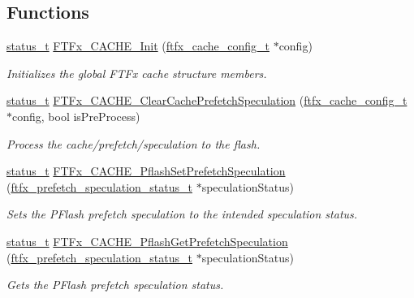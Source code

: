 \subsection*{Functions}
\begin{DoxyCompactItemize}
\item 
\mbox{\hyperlink{group__ksdk__common_gaaabdaf7ee58ca7269bd4bf24efcde092}{status\+\_\+t}} \mbox{\hyperlink{group__ftfx__cache__driver_ga4615ae98db65653ab1a578eb588d1be4}{F\+T\+Fx\+\_\+\+C\+A\+C\+H\+E\+\_\+\+Init}} (\mbox{\hyperlink{group__ftfx__cache__driver_ga8ddae8f98cec13ff7c33bc515d01c487}{ftfx\+\_\+cache\+\_\+config\+\_\+t}} $\ast$config)
\begin{DoxyCompactList}\small\item\em Initializes the global F\+T\+Fx cache structure members. \end{DoxyCompactList}\item 
\mbox{\hyperlink{group__ksdk__common_gaaabdaf7ee58ca7269bd4bf24efcde092}{status\+\_\+t}} \mbox{\hyperlink{group__ftfx__cache__driver_ga9de53487ab56d930f26f14f4410b6f20}{F\+T\+Fx\+\_\+\+C\+A\+C\+H\+E\+\_\+\+Clear\+Cache\+Prefetch\+Speculation}} (\mbox{\hyperlink{group__ftfx__cache__driver_ga8ddae8f98cec13ff7c33bc515d01c487}{ftfx\+\_\+cache\+\_\+config\+\_\+t}} $\ast$config, bool is\+Pre\+Process)
\begin{DoxyCompactList}\small\item\em Process the cache/prefetch/speculation to the flash. \end{DoxyCompactList}\item 
\mbox{\hyperlink{group__ksdk__common_gaaabdaf7ee58ca7269bd4bf24efcde092}{status\+\_\+t}} \mbox{\hyperlink{group__ftfx__cache__driver_ga00b01fe1b09708867e1302f35da35e0d}{F\+T\+Fx\+\_\+\+C\+A\+C\+H\+E\+\_\+\+Pflash\+Set\+Prefetch\+Speculation}} (\mbox{\hyperlink{group__ftfx__cache__driver_ga4ee23b743843fdca0f97dfbb91c105b7}{ftfx\+\_\+prefetch\+\_\+speculation\+\_\+status\+\_\+t}} $\ast$speculation\+Status)
\begin{DoxyCompactList}\small\item\em Sets the P\+Flash prefetch speculation to the intended speculation status. \end{DoxyCompactList}\item 
\mbox{\hyperlink{group__ksdk__common_gaaabdaf7ee58ca7269bd4bf24efcde092}{status\+\_\+t}} \mbox{\hyperlink{group__ftfx__cache__driver_gaa1841b33e5241e1a94e54bd35dc58c9e}{F\+T\+Fx\+\_\+\+C\+A\+C\+H\+E\+\_\+\+Pflash\+Get\+Prefetch\+Speculation}} (\mbox{\hyperlink{group__ftfx__cache__driver_ga4ee23b743843fdca0f97dfbb91c105b7}{ftfx\+\_\+prefetch\+\_\+speculation\+\_\+status\+\_\+t}} $\ast$speculation\+Status)
\begin{DoxyCompactList}\small\item\em Gets the P\+Flash prefetch speculation status. \end{DoxyCompactList}\end{DoxyCompactItemize}
